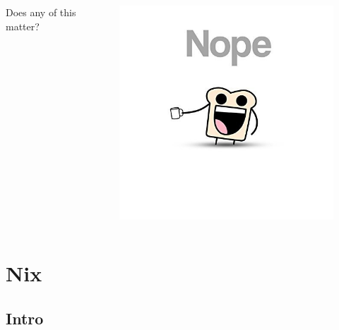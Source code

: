 \documentclass{beamer}
\begin{document}
\begin{frame}
    \begin{columns}
        \begin{column}{0.5\textwidth}
            Does any of this matter?
        \end{column}
        \begin{column}{0.5\textwidth}
            \begin{figure}
                \centering
                \includegraphics[width=\textwidth,keepaspectratio]{../resources/nope.jpg}
            \end{figure}
        \end{column}
    \end{columns}
\end{frame}

\section{Nix}
\subsection{Intro}
\end{document}
